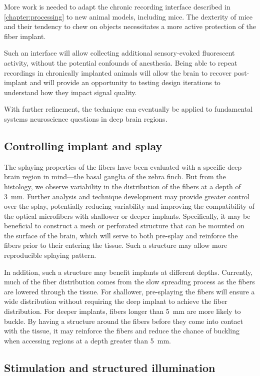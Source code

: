More work is needed to adapt the chronic recording 
interface described in \cref{chapter:processing} to 
new animal models, including mice. The dexterity of  
mice and their tendency to chew on objects necessitates 
a more active protection of the fiber implant.

Such an interface will allow collecting additional 
sensory-evoked fluorescent activity, without the 
potential confounds of anesthesia. Being able to 
repeat recordings in chronically implanted animals 
will allow the brain to recover post-implant and will 
provide an opportunity to testing design iterations 
to understand how they impact signal quality.

With further refinement, the technique can eventually 
be applied to fundamental systems neuroscience 
questions in deep brain regions.

\subsection{Controlling implant and splay}

The splaying properties of the fibers have been 
evaluated with a specific deep brain region 
in mind---the basal ganglia of the zebra finch.
But from the histology, we observe variability 
in the distribution of the fibers at a depth of 
3~mm. Further analysis and technique development 
may provide greater control over the splay, 
potentially reducing variability and improving 
the compatibility of the optical microfibers with 
shallower or deeper implants. Specifically, it 
may be beneficial to construct a mesh or perforated 
structure that can be mounted on the surface of the 
brain, which will serve to both pre-splay and reinforce 
the fibers prior to their entering the tissue. Such a structure 
may allow more reproducible splaying pattern. 

In addition, such a structure may 
benefit implants at different depths. Currently, 
much of the fiber distribution comes from the slow 
spreading process as the fibers are lowered through
the tissue. For shallower, pre-splaying the fibers 
will ensure a wide distribution without requiring 
the deep implant to achieve the fiber distribution. 
For deeper implants, fibers longer than 5~mm are 
more likely to buckle. By having a structure around 
the fibers before they come into contact with the 
tissue, it may reinforce the fibers and reduce the 
chance of buckling when accessing regions at a depth 
greater than 5~mm.

\subsection{Stimulation and structured illumination}

